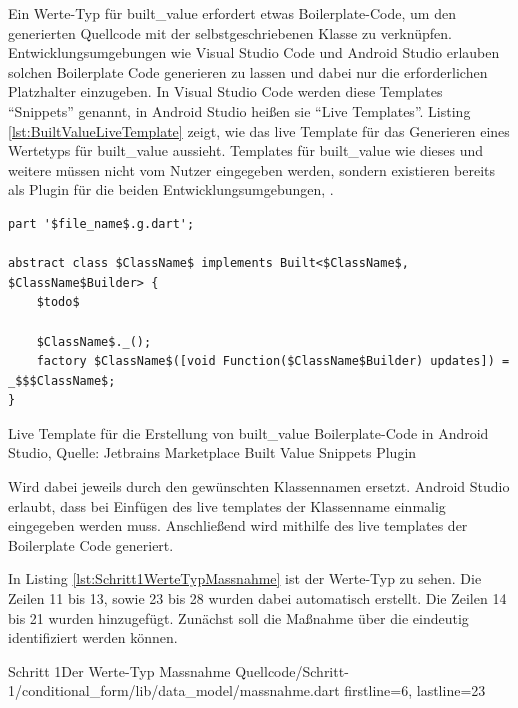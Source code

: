 Ein Werte-Typ für built_value erfordert etwas Boilerplate-Code,  um den generierten Quellcode mit der selbstgeschriebenen Klasse zu verknüpfen.  
Entwicklungsumgebungen wie Visual Studio Code und Android Studio erlauben solchen Boilerplate Code generieren zu lassen und dabei nur die erforderlichen Platzhalter einzugeben.
In Visual Studio Code werden diese Templates \enquote{Snippets} genannt, in Android Studio heißen sie \enquote{Live Templates}.  Listing \ref{lst:BuiltValueLiveTemplate} zeigt, wie das live Template für das Generieren eines Wertetyps  für built_value aussieht. Templates für built_value wie dieses und weitere müssen nicht vom Nutzer eingegeben werden, sondern existieren bereits als Plugin für die beiden Entwicklungsumgebungen, .



\begin{listing}[h]
  \begin{verbatim}
part '$file_name$.g.dart';

abstract class $ClassName$ implements Built<$ClassName$, $ClassName$Builder> {
    $todo$
    
    $ClassName$._();
    factory $ClassName$([void Function($ClassName$Builder) updates]) = _$$$ClassName$;
}
\end{verbatim}
  \caption[built_value Live Template]{Live Template für die Erstellung von built_value Boilerplate-Code in Android Studio, Quelle: Jetbrains Marketplace Built Value Snippets Plugin}
  \label{lst:BuiltValueLiveTemplate}
\end{listing}

 Wird dabei jeweils durch den gewünschten Klassennamen ersetzt. Android Studio erlaubt, dass bei Einfügen des live templates der Klassenname einmalig eingegeben werden muss.  Anschließend wird mithilfe des live templates der Boilerplate Code generiert.

In Listing \ref{lst:Schritt1WerteTypMassnahme} ist der Werte-Typ  zu sehen. Die Zeilen 11 bis 13, sowie 23 bis 28 wurden dabei automatisch erstellt. Die Zeilen 14 bis 21 wurden hinzugefügt. Zunächst soll die Maßnahme über die  eindeutig identifiziert werden können.

\begin{alexlisting}{Schritt 1}{Der Werte-Typ Massnahme}
  {Quellcode/Schritt-1/conditional_form/lib/data_model/massnahme.dart}
  {firstline=6, lastline=23}
  \label{lst:Schritt1WerteTypMassnahme}
\end{alexlisting}

